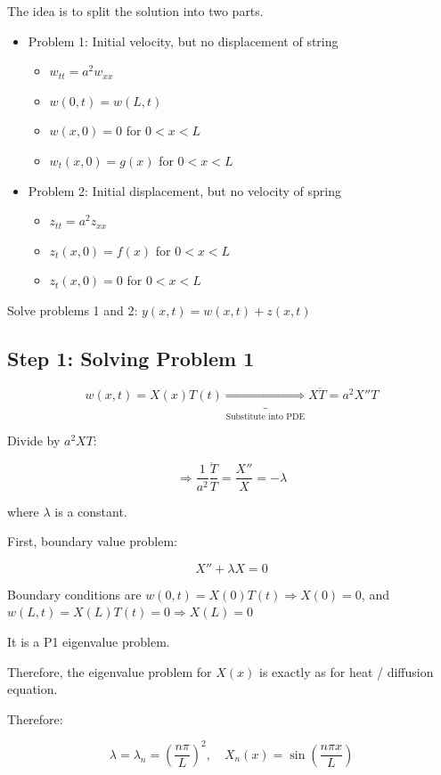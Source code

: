 \documentclass{article}
\begin{document}
The idea is to split the solution into two parts. 


\begin{itemize}
    \item Problem 1: Initial velocity, but no displacement of string
    \begin{itemize}
        \item $w_{tt} = a^2 w_{xx}$
        \item $w(0,t) = w(L,t)$
        \item $w(x,0) = 0$ for $0 < x < L$
        \item $w_t(x,0) = g(x)$ for $0 < x < L$
    \end{itemize}
    \item Problem 2: Initial displacement, but no velocity of spring
    \begin{itemize}
        \item $z_{tt} = a^2 z_{xx}$
        \item $z_t (x,0) = f(x)$ for $0 < x < L$
        \item $z_t(x,0) = 0$ for $0 < x < L$
    \end{itemize}
\end{itemize}

Solve problems 1 and 2: $y(x,t) = w(x,t) + z(x,t)$

\subsection*{Step 1: Solving Problem 1}

$$w(x,t) = X(x) T(t) \underbrace{\Rightarrow}_{\text{Substitute into PDE}} X \ddot{T} = a^2 X'' T$$

Divide by $a^2 X T$:

$$\Rightarrow \frac{1}{a^2} \frac{\ddot T}{T} = \frac{X''}{X} = - \lambda$$

where $\lambda$ is a constant. 

First, boundary value problem:

$$X'' + \lambda X = 0$$

Boundary conditions are $w(0,t) = X(0) T(t) \Rightarrow X(0) = 0$, and $w(L,t) = X(L) T(t) = 0 \Rightarrow X(L) = 0$

It is a P1 eigenvalue problem. 

Therefore, the eigenvalue problem for $X(x)$ is exactly as for heat / diffusion equation. 

Therefore:

$$\lambda = \lambda_n = \left( \frac{n \pi}{L} \right)^2, \quad X_n (x) = \sin \left(\frac{n \pi x}{L} \right)$$
\end{document}
